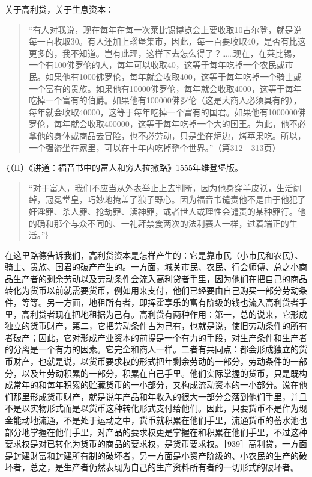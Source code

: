 关于高利贷，关于生息资本：

\begin{quote}{“有人对我说，现在每年在每一次莱比锡博览会上要收取10古尔登，就是说每一百收取30。有人还加上瑙堡集市，因此，每一百要收取40，是否有比这更多的，我不知道。岂有此理，这样下去怎么得了？……现在，在莱比锡，一个有100佛罗伦的人，每年可以收取40，这等于每年吃掉一个农民或市民。如果他有1000佛罗伦，每年就会收取400，这等于每年吃掉一个骑士或一个富有的贵族。如果他有10000佛罗伦，每年就会收取4000，这等于每年吃掉一个富有的伯爵。如果他有100000佛罗伦（这是大商人必须具有的），每年就会收取40000，这等于每年吃掉一个富有的国君。如果他有1000000佛罗伦，每年就会收取400000，这等于每年吃掉一个大的国王。为此，他不必拿他的身体或商品去冒险，也不必劳动，只是坐在炉边，烤苹果吃。所以，一个强盗坐在家里，可以在十年内吃掉整个世界。”（第312—313页）}\end{quote}

｛（II）《讲道：福音书中的富人和穷人拉撒路》1555年维登堡版。

\begin{quote}{“对于富人，我们不应当从外表举止上去判断，因为他身穿羊皮袄，生活阔绰，冠冕堂皇，巧妙地掩盖了狼子野心。因为福音书谴责他不是由于他犯了奸淫罪、杀人罪、抢劫罪、渎神罪，或者世人或理性会谴责的某种罪行。他的确和那个与众不同的、一礼拜禁食两次的法利赛人一样，过着端正的生活。”｝}\end{quote}

在这里路德告诉我们，高利贷资本是怎样产生的：它是靠市民（小市民和农民）、骑士、贵族、国君的破产产生的。一方面，城关市民、农民、行会师傅、总之小商品生产者的剩余劳动以及劳动条件会流入高利贷者手里，因为他们在把自己的商品转化为货币以前就需要货币，例如用来支付，他们已经要由自己购买一部分劳动条件，等等。另一方面，地租所有者，即挥霍享乐的富有阶级的钱也流入高利贷者手里，高利贷者现在把地租据为己有。高利贷有两种作用：第一，总的说来，它形成独立的货币财产，第二，它把劳动条件占为己有，也就是说，使旧劳动条件的所有者破产；因此，它对形成产业资本的前提是一个有力的手段，对生产条件和生产者的分离是一个有力的因素。它完全和商人一样。二者有共同点：都会形成独立的货币财产，也就是说，以货币要求权的形式把年剩余劳动的一部分，劳动条件的一部分，以及年劳动积累的一部分，积累在自己手里。他们实际掌握的货币，只是既构成常年的和每年积累的贮藏货币的一小部分，又构成流动资本的一小部分。说在他们那里形成货币财产，就是说年产品和年收入的很大一部分会落到他们手里，并且不是以实物形式而是以货币这种转化形式支付给他们。因此，只要货币不是作为现金能动地流通，不是处于运动之中，货币就积累在他们手里，流通货币的蓄水池也部分地掌握在他们手里，对产品的要求权更是掌握在和积累在他们手里，不过这种要求权是对已转化为货币的商品的要求权，是货币要求权。［939］高利贷，一方面是封建财富和封建所有制的破坏者，另一方面是小资产阶级的、小农民的生产的破坏者，总之，是生产者仍然表现为自己的生产资料所有者的一切形式的破坏者。

